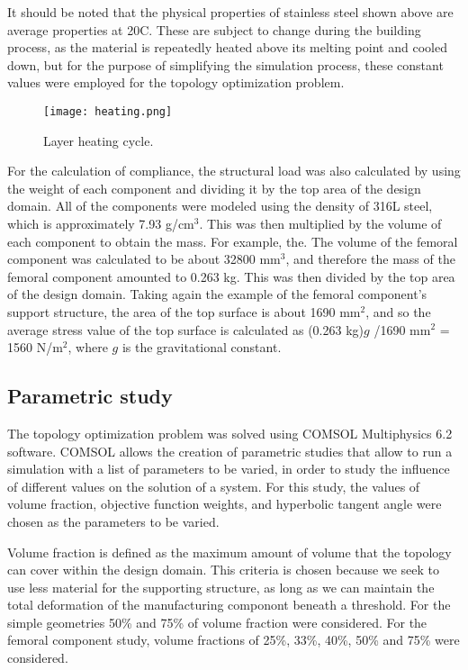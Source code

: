 \documentclass[../main.tex]{subfiles}
\begin{document}
It should be noted that the physical properties of stainless steel shown above are average properties at 20\degree C. These are subject to change during the building process, as the material is repeatedly heated above its melting point and cooled down, but for the purpose of simplifying the simulation process, these constant values were employed for the topology optimization problem. 

\begin{figure}
  \texttt{[image: heating.png]}
  \caption{Layer heating cycle.}
  \label{fig:heating}
\end{figure}

For the calculation of compliance, the structural load was also calculated by using the weight of each component and dividing it by the top area of the design domain. All of the components were modeled using the density of 316L steel, which is approximately 7.93 g/cm$^3$. This was then multiplied by the volume of each component to obtain the mass. For example, the. The volume of the femoral component was calculated to be about 32800 mm$^3$, and therefore the mass of the femoral component amounted to 0.263 kg. This was then divided by the top area of the design domain. Taking again the example of the femoral component's support structure, the area of the top surface is about 1690 mm$^2$, and so the average stress value of the top surface is calculated as (0.263 kg)$g$ /1690 mm$^2$ = 1560 N/m$^2$, where $g$ is the gravitational constant. 

\subsection{Parametric study}

The topology optimization problem was solved using COMSOL Multiphysics 6.2 software. COMSOL allows the creation of parametric studies that allow to run a simulation with a list of parameters to be varied, in order to study the influence of different values on the solution of a system. For this study, the values of volume fraction, objective function weights, and hyperbolic tangent angle were chosen as the parameters to be varied.

Volume fraction is defined as the maximum amount of volume that the topology can cover within the design domain. This criteria is chosen because we seek to use less material for the supporting structure, as long as we can maintain the total deformation of the manufacturing componont beneath a threshold. For the simple geometries 50\% and 75\% of volume fraction were considered. For the femoral component study, volume fractions of 25\%, 33\%, 40\%, 50\% and 75\% were considered. 
\end{document}
